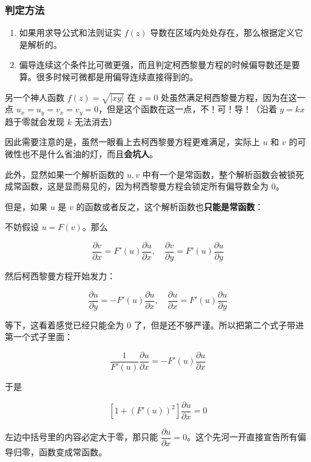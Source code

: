 \subsubsection{判定方法}
\label{判定方法}
\begin{enumerate}
\item 如果用求导公式和法则证实 \(f(z)\)
导数在区域内处处存在，那么根据定义它是解析的。
\item 偏导连续这个条件比可微更强，而且判定柯西黎曼方程的时候偏导数还是要算。很多时候可微都是用偏导连续直接得到的。
\end{enumerate}

\begin{tcolorbox}[title={例题引出的一些内容},colback=red!5!white
,colframe=red!75!black
,colbacktitle=yellow!50!red
,coltitle=red!25!black, fonttitle=\bfseries,subtitle style={boxrule=0.4pt, colback=yellow!50!red!25!white}]
另一个神人函数 \(f(z)=\sqrt{|xy|}\) 在
\(z=0\) 处虽然满足柯西黎曼方程，因为在这一点
\(u_x=u_y=v_x=v_y=0\)，但是这个函数在这一点，不！可！导！（沿着 \(y=kx\)
趋于零就会发现 \(k\) 无法消去）

因此需要注意的是，虽然一眼看上去柯西黎曼方程更难满足，实际上 \(u\) 和 \(v\) 的可微性也不是什么省油的灯，而且\textbf{会坑人}。

此外，显然如果一个解析函数的 \(u,v\) 中有一个是常函数，整个解析函数会被锁死成常函数，这是显而易见的，因为柯西黎曼方程会锁定所有偏导数全为 0。

但是，如果 \(u\) 是 \(v\) 的函数或者反之，这个解析函数也\textbf{只能是常函数}：

不妨假设 \(u=F(v)\)。那么

$$
\frac{\partial v}{\partial x}=F'(u)\frac{\partial u}{\partial x},\quad \frac{\partial v}{\partial y}=F'(u)\frac{\partial u}{\partial y}
$$

然后柯西黎曼方程开始发力：

$$
\frac{\partial u}{\partial y}=-F'(u)\frac{\partial u}{\partial x},\quad \frac{\partial u}{\partial x}=F'(u)\frac{\partial u}{\partial y}
$$

等下，这看着感觉已经只能全为 \(0\) 了，但是还不够严谨。所以把第二个式子带进第一个式子里面：

$$
\frac{1}{F'(u)} \frac{\partial u}{\partial x} = -F'(u) \frac{\partial u}{\partial x}
$$

于是

$$
\left[1 + (F'(u))^2\right] \frac{\partial u}{\partial x} = 0
$$

左边中括号里的内容必定大于零，那只能 \(\dfrac{\partial u}{\partial x}=0\)。这个先河一开直接宣告所有偏导归零，函数变成常函数。

\end{tcolorbox}

